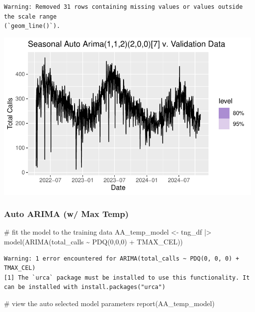 \documentclass[
  letterpaper,
  DIV=11,
  numbers=noendperiod]{scrartcl}
\newenvironment{Shaded}{\begin{snugshade}}{\end{snugshade}}
\newcommand{\CommentTok}[1]{\textcolor[rgb]{0.37,0.37,0.37}{#1}}
\newcommand{\DecValTok}[1]{\textcolor[rgb]{0.68,0.00,0.00}{#1}}
\newcommand{\FunctionTok}[1]{\textcolor[rgb]{0.28,0.35,0.67}{#1}}
\newcommand{\NormalTok}[1]{\textcolor[rgb]{0.00,0.23,0.31}{#1}}
\newcommand{\OtherTok}[1]{\textcolor[rgb]{0.00,0.23,0.31}{#1}}
\newcommand{\SpecialCharTok}[1]{\textcolor[rgb]{0.37,0.37,0.37}{#1}}
\begin{document}
\begin{verbatim}
Warning: Removed 31 rows containing missing values or values outside the scale range
(`geom_line()`).
\end{verbatim}

\includegraphics{final_proj_group1_files/figure-pdf/visualize_seasonal_AARIMA-1.pdf}

\subsubsection{Auto ARIMA (w/ Max Temp)}\label{auto-arima-w-max-temp}

\begin{Shaded}
\begin{Highlighting}[]
\CommentTok{\# fit the model to the training data}
\NormalTok{AA\_temp\_model }\OtherTok{\textless{}{-}}\NormalTok{ tng\_df }\SpecialCharTok{|\textgreater{}}
  \FunctionTok{model}\NormalTok{(}\FunctionTok{ARIMA}\NormalTok{(total\_calls }\SpecialCharTok{\textasciitilde{}} \FunctionTok{PDQ}\NormalTok{(}\DecValTok{0}\NormalTok{,}\DecValTok{0}\NormalTok{,}\DecValTok{0}\NormalTok{) }\SpecialCharTok{+} 
\NormalTok{                TMAX\_CEL))}
\end{Highlighting}
\end{Shaded}

\begin{verbatim}
Warning: 1 error encountered for ARIMA(total_calls ~ PDQ(0, 0, 0) + TMAX_CEL)
[1] The `urca` package must be installed to use this functionality. It can be installed with install.packages("urca")
\end{verbatim}

\begin{Shaded}
\begin{Highlighting}[]
\CommentTok{\# view the auto selected model parameters}
\FunctionTok{report}\NormalTok{(AA\_temp\_model)}
\end{Highlighting}
\end{Shaded}
\end{document}

